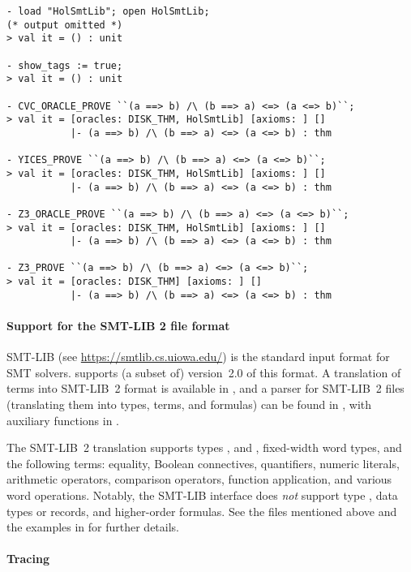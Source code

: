 \begin{session}
\begin{verbatim}
- load "HolSmtLib"; open HolSmtLib;
(* output omitted *)
> val it = () : unit

- show_tags := true;
> val it = () : unit

- CVC_ORACLE_PROVE ``(a ==> b) /\ (b ==> a) <=> (a <=> b)``;
> val it = [oracles: DISK_THM, HolSmtLib] [axioms: ] []
           |- (a ==> b) /\ (b ==> a) <=> (a <=> b) : thm

- YICES_PROVE ``(a ==> b) /\ (b ==> a) <=> (a <=> b)``;
> val it = [oracles: DISK_THM, HolSmtLib] [axioms: ] []
           |- (a ==> b) /\ (b ==> a) <=> (a <=> b) : thm

- Z3_ORACLE_PROVE ``(a ==> b) /\ (b ==> a) <=> (a <=> b)``;
> val it = [oracles: DISK_THM, HolSmtLib] [axioms: ] []
           |- (a ==> b) /\ (b ==> a) <=> (a <=> b) : thm

- Z3_PROVE ``(a ==> b) /\ (b ==> a) <=> (a <=> b)``;
> val it = [oracles: DISK_THM] [axioms: ] []
           |- (a ==> b) /\ (b ==> a) <=> (a <=> b) : thm
\end{verbatim}
\end{session}

\paragraph{Support for the SMT-LIB 2 file format}

SMT-LIB (see \url{https://smtlib.cs.uiowa.edu/}) is the standard input
format for SMT solvers.   supports (a subset of)
version~2.0 of this format.  A translation of \HOL{} terms into
SMT-LIB~2 format is available in , and a parser for
SMT-LIB~2 files (translating them into \HOL{} types, terms, and
formulas) can be found in , with auxiliary
functions in .

The SMT-LIB~2 translation supports types , 
and , fixed-width word types, and the following terms:
equality, Boolean connectives, quantifiers, numeric literals,
arithmetic operators, comparison operators, function application, and
various word operations.  Notably, the SMT-LIB interface does
\emph{not} support type , data types or records, and
higher-order formulas.  See the files mentioned above and the examples
in  for further details.

\paragraph{Tracing}

